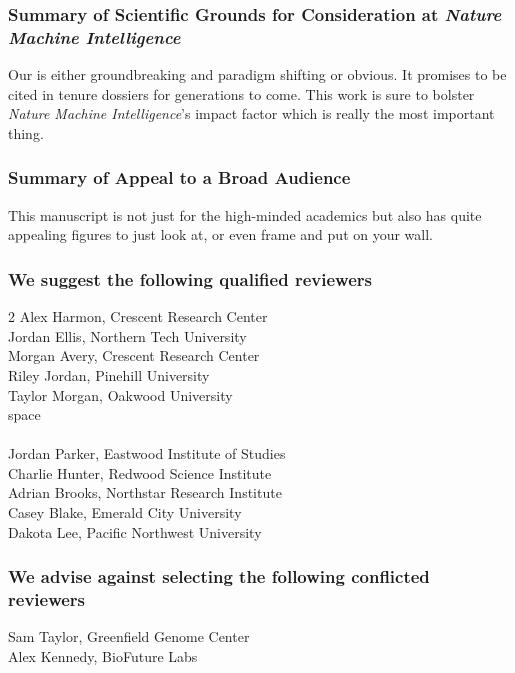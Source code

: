 \documentclass[10pt]{article}
\newcommand{\journalname}{Nature Machine Intelligence}
\begin{document}
\subsubsection*{Summary of Scientific Grounds for Consideration at \textit{\journalname}}
Our is either groundbreaking and paradigm shifting or obvious. It promises to be cited in tenure dossiers for generations to come. This work is sure to bolster \textit{\journalname}'s impact factor which is really the most important thing. 

\subsubsection*{Summary of Appeal to a Broad Audience}
This manuscript is not just for the high-minded academics but also has quite appealing figures to just look at, or even frame and put on your wall.

\subsubsection*{We suggest the following qualified reviewers}
\begin{multicols}{2}
\noindent Alex Harmon, Crescent Research Center\\
Jordan Ellis, Northern Tech University\\
Morgan Avery, Crescent Research Center\\
Riley Jordan, Pinehill University\\ 
Taylor Morgan, Oakwood University\\
{\color{white} space \\}\\
Jordan Parker, Eastwood Institute of Studies\\ 
Charlie Hunter, Redwood Science Institute\\ Adrian Brooks, Northstar Research Institute\\
Casey Blake, Emerald City University\\
Dakota Lee, Pacific Northwest University\\
\end{multicols}
\vspace{-0.75cm}
\subsubsection*{We advise against selecting the following conflicted reviewers}
\noindent Sam Taylor, Greenfield Genome Center\\
Alex Kennedy, BioFuture Labs
\end{document}

